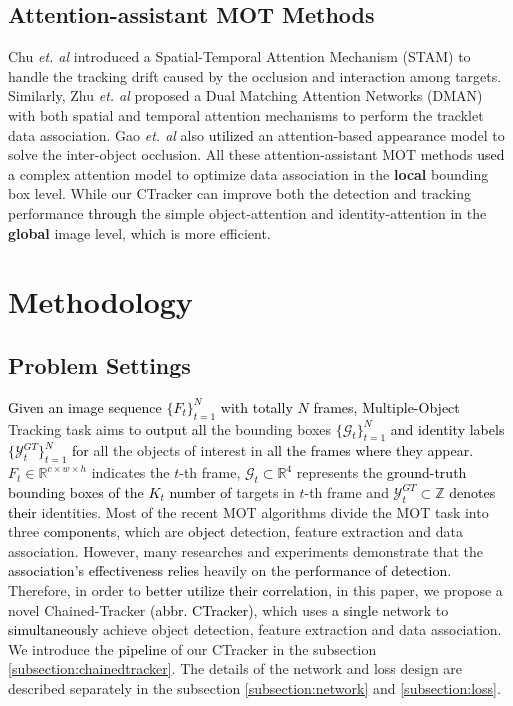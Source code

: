 \documentclass[../arXiv_main.tex]{subfiles}
\newcommand\wfb[1]{\textcolor{black}{#1}}
\newcommand{\yang}[1]{\textcolor{black}{#1}}
\newcommand\CRwfb[1]{\textcolor{black}{#1}}
\newcommand{\CRyang}[1]{\textcolor{black}{#1}}
\begin{document}
\subsection{Attention-assistant MOT Methods}
Chu \textit{et. al} \cite{chu2017online} introduced a Spatial-Temporal Attention Mechanism (STAM) to handle the tracking drift caused by the occlusion and interaction among targets. Similarly, Zhu \textit{et. al} \cite{zhu2018online} proposed a Dual Matching Attention Networks (DMAN) with both spatial and temporal attention mechanisms to perform the tracklet data association. Gao \textit{et. al} \cite{gao2018osmo} also \CRwfb{utilized} an attention-based appearance model to solve the inter-object occlusion. All these attention-assistant MOT methods \CRwfb{used} \wfb{a} complex attention model to optimize data association in the \textbf{local} bounding box level. While our CTracker can improve both the detection and tracking performance \CRwfb{through} the simple object-attention and identity-attention in the \textbf{global} image level, which is more efficient.


\section{Methodology}
\subsection{Problem Settings}

\wfb{Given an image \CRyang{sequence} $\{F_{t}\} _{t=1}^{N}$ with totally $N$ frames,} \yang{Multiple-Object} Tracking task aims to \wfb{\CRyang{output} all} the bounding boxes \CRyang{$\{\mathcal{G}_{t}\} _{t=1}^{N}$ and identity labels $\{\mathcal{Y}^{GT}_{t}\} _{t=1}^{N}$ for} all the objects of interest in \CRyang{all the frames where they appear.} $F_{t}\in\mathbb{R^{\mathit{c\times w\times h}}}$
indicates the $t$-th frame, \CRyang{$\mathcal{G}_{t} \subset {\mathbb{R}^4}$}
represents the \CRyang{ground-truth bounding boxes of the $K_t$ number of} targets in $t$-th
frame and \CRyang{$\mathcal{Y}^{GT}_{t} \subset \mathbb{Z}$ denotes their} identities. Most of the recent MOT algorithms divide the MOT task into three \CRyang{components}, which are \CRyang{object} detection, feature extraction and data association.
However, many researches and experiments demonstrate that the \CRyang{association's effectiveness} \wfb{relies} heavily  on the \CRwfb{performance of detection}. Therefore, in order to \CRyang{better utilize their correlation,} in this paper, we propose a novel Chained-Tracker \CRyang{(abbr. CTracker)}, which uses \CRyang{a single} network to \CRyang{simultaneously} achieve object detection, feature extraction and data association. We introduce the \CRyang{pipeline} of our CTracker in the subsection \ref{subsection:chainedtracker}. The details of the network and loss design are described separately in the subsection \ref{subsection:network} and \ref{subsection:loss}. 
\end{document}
